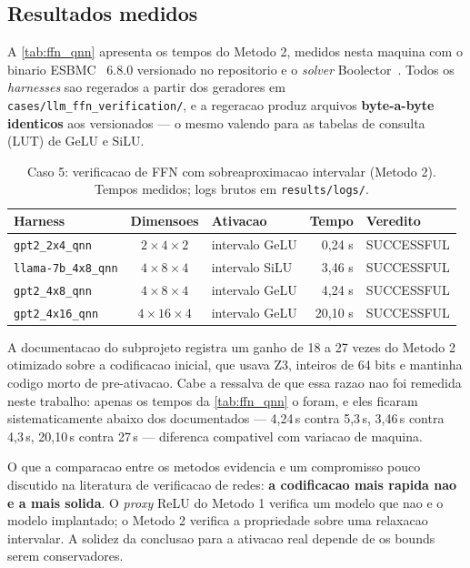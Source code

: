 \subsection{Resultados medidos}

A \autoref{tab:ffn_qnn} apresenta os tempos do Metodo 2, medidos nesta maquina
com o binario ESBMC~\cite{gadelha2018esbmc} 6.8.0 versionado no repositorio e o
\textit{solver} Boolector~\cite{niemetz2014boolector}.
Todos os \textit{harnesses} sao regerados a partir dos geradores em
\texttt{cases/llm\_ffn\_verification/}, e a regeracao produz arquivos
\textbf{byte-a-byte identicos} aos versionados --- o mesmo valendo para as tabelas
de consulta (LUT) de GeLU e SiLU.

\begin{table}[htb]
\caption{Caso 5: verificacao de FFN com sobreaproximacao intervalar (Metodo 2). Tempos medidos;
logs brutos em \texttt{results/logs/}.}
\label{tab:ffn_qnn}
\begin{center}
\begin{tabular}{l|c|l|r|l}
\hline
\textbf{Harness} & \textbf{Dimensoes} & \textbf{Ativacao} & \textbf{Tempo} & \textbf{Veredito} \\
\hline
\texttt{gpt2\_2x4\_qnn}     & $2{\times}4{\times}2$  & intervalo GeLU & 0,24 s  & SUCCESSFUL \\
\texttt{llama-7b\_4x8\_qnn} & $4{\times}8{\times}4$  & intervalo SiLU & 3,46 s  & SUCCESSFUL \\
\texttt{gpt2\_4x8\_qnn}     & $4{\times}8{\times}4$  & intervalo GeLU & 4,24 s  & SUCCESSFUL \\
\texttt{gpt2\_4x16\_qnn}    & $4{\times}16{\times}4$ & intervalo GeLU & 20,10 s & SUCCESSFUL \\
\hline
\end{tabular}
\end{center}
\end{table}

A documentacao do subprojeto registra um ganho de 18 a 27 vezes do Metodo 2
otimizado sobre a codificacao inicial, que usava Z3, inteiros de 64 bits e mantinha
codigo morto de pre-ativacao. Cabe a ressalva de que essa razao nao foi remedida
neste trabalho: apenas os tempos da \autoref{tab:ffn_qnn} o foram, e eles ficaram
sistematicamente abaixo dos documentados --- 4,24\,s contra 5,3\,s, 3,46\,s contra
4,3\,s, 20,10\,s contra 27\,s --- diferenca compativel com variacao de maquina.

O que a comparacao entre os metodos evidencia e um compromisso pouco discutido na
literatura de verificacao de redes: \textbf{a codificacao mais rapida nao e a mais
solida}. O \textit{proxy} ReLU do Metodo 1 verifica um modelo que nao e o modelo
implantado; o Metodo 2 verifica a propriedade sobre uma relaxacao intervalar. A
solidez da conclusao para a ativacao real depende de os bounds serem conservadores.

